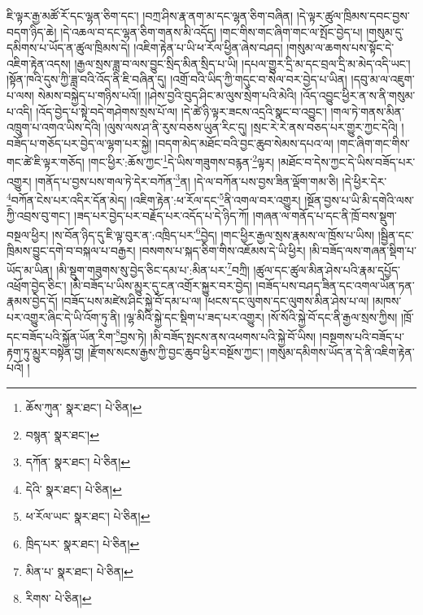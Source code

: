 ཇི་ལྟར་རྒྱ་མཚོ་རོ་དང་ལྷན་ཅིག་དང་། །བཀྲ་ཤིས་རྣ་ནག་མ་དང་ལྷན་ཅིག་བཞིན། །དེ་ལྟར་ཚུལ་ཁྲིམས་དབང་བྱས་བདག་ཉིད་ཆེ། །དེ་འཆལ་བ་དང་ལྷན་ཅིག་གནས་མི་འདོད། །གང་གིས་གང་ཞིག་གང་ལ་སྤོང་བྱེད་པ། །གསུམ་དུ་དམིགས་པ་ཡོད་ན་ཚུལ་ཁྲིམས་དེ། །འཇིག་རྟེན་པ་ཡི་ཕ་རོལ་ཕྱིན་ཞེས་བཤད། །གསུམ་ལ་ཆགས་པས་སྟོང་དེ་འཇིག་རྟེན་འདས། །རྒྱལ་སྲས་ཟླ་བ་ལས་བྱུང་སྲིད་མིན་སྲིད་པ་ཡི། །དཔལ་གྱུར་དྲི་མ་དང་བྲལ་དྲི་མ་མེད་འདི་ཡང་། །སྟོན་ཁའི་དུས་ཀྱི་ཟླ་བའི་འོད་ནི་ཇི་བཞིན་དུ། །འགྲོ་བའི་ཡིད་ཀྱི་གདུང་བ་སེལ་བར་བྱེད་པ་ཡིན། །དབུ་མ་ལ་འཇུག་པ་ལས། སེམས་བསྐྱེད་པ་གཉིས་པའོ།། །།ཤེས་བྱའི་བུད་ཤིང་མ་ལུས་སྲེག་པའི་མེའི། །འོད་འབྱུང་ཕྱིར་ན་ས་ནི་གསུམ་པ་འདི། །འོད་བྱེད་པ་སྟེ་བདེ་གཤེགས་སྲས་པོ་ལ། །དེ་ཚེ་ཉི་ལྟར་ཟངས་འདྲའི་སྣང་བ་འབྱུང་། །གལ་ཏེ་གནས་མིན་འཁྲུག་པ་འགའ་ཡིས་དེའི། །ལུས་ལས་ཤ་ནི་རུས་བཅས་ཡུན་རིང་དུ། །སྲང་རེ་རེ་ནས་བཅད་པར་གྱུར་ཀྱང་དེའི། །བཟོད་པ་གཅོད་པར་བྱེད་ལ་ལྷག་པར་སྐྱེ། །བདག་མེད་མཐོང་བའི་བྱང་ཆུབ་སེམས་དཔའ་ལ། །གང་ཞིག་གང་གིས་གང་ཚེ་ཇི་ལྟར་གཅོད། །གང་ཕྱིར་:ཆོས་ཀྱང་\footnote{ཆོས་ཀུན་  སྣར་ཐང་།  པེ་ཅིན། }དེ་ཡིས་གཟུགས་བརྙན་\footnote{བསྙན་  སྣར་ཐང་། }ལྟར། །མཐོང་བ་དེས་ཀྱང་དེ་ཡིས་བཟོད་པར་འགྱུར། །གནོད་པ་བྱས་པས་གལ་ཏེ་དེར་བཀོན་\footnote{དཀོན་  སྣར་ཐང་།  པེ་ཅིན། }ན། །དེ་ལ་བཀོན་པས་བྱས་ཟིན་ལྡོག་གམ་ཅི། །དེ་ཕྱིར་དེར་\footnote{དེའི་  སྣར་ཐང་།  པེ་ཅིན། }བཀོན་ངེས་པར་འདིར་དོན་མེད། །འཇིག་རྟེན་:ཕ་རོལ་དང་\footnote{ཕ་རོལ་ཡང་  སྣར་ཐང་།  པེ་ཅིན། }ནི་འགལ་བར་འགྱུར། །སྔོན་བྱས་པ་ཡི་མི་དགེའི་ལས་ཀྱི་འབྲས་བུ་གང་། །ཟད་པར་བྱེད་པར་བརྗོད་པར་འདོད་པ་དེ་ཉིད་ཀོ། །གཞན་ལ་གནོད་པ་དང་ནི་ཁྲོ་བས་སྡུག་བསྔལ་ཕྱིར། །ས་བོན་ཉིད་དུ་ཇི་ལྟ་བུར་ན་:འཁྲིད་པར་\footnote{ཁྲིད་པར་  སྣར་ཐང་།  པེ་ཅིན། }བྱེད། །གང་ཕྱིར་རྒྱལ་སྲས་རྣམས་ལ་ཁྲོས་པ་ཡིས། །སྦྱིན་དང་ཁྲིམས་བྱུང་དགེ་བ་བསྐལ་པ་བརྒྱར། །བསགས་པ་སྐད་ཅིག་གིས་འཇོམས་དེ་ཡི་ཕྱིར། །མི་བཟོད་ལས་གཞན་སྡིག་པ་ཡོད་མ་ཡིན། །མི་སྡུག་གཟུགས་སུ་བྱེད་ཅིང་དམ་པ་:མིན་པར་\footnote{མིན་པ་  སྣར་ཐང་།  པེ་ཅིན། }བཀྲི། །ཚུལ་དང་ཚུལ་མིན་ཤེས་པའི་རྣམ་དཔྱོད་འཕྲོག་བྱེད་ཅིང་། །མི་བཟོད་པ་ཡིས་མྱུར་དུ་ངན་འགྲོར་སྐྱུར་བར་བྱེད། །བཟོད་པས་བཤད་ཟིན་དང་འགལ་ཡོན་ཏན་རྣམས་བྱེད་དོ། །བཟོད་པས་མཛེས་ཤིང་སྐྱེ་བོ་དམ་པ་ལ། །ཕངས་དང་ལུགས་དང་ལུགས་མིན་ཤེས་པ་ལ། །མཁས་པར་འགྱུར་ཞིང་དེ་ཡི་འོག་ཏུ་ནི། །ལྷ་མིའི་སྐྱེ་དང་སྡིག་པ་ཟད་པར་འགྱུར། །སོ་སོའི་སྐྱེ་བོ་དང་ནི་རྒྱལ་སྲས་ཀྱིས། །ཁྲོ་དང་བཟོད་པའི་སྐྱོན་ཡོན་རིག་\footnote{རིགས་  པེ་ཅིན། }བྱས་ཏེ། །མི་བཟོད་སྤངས་ནས་འཕགས་པའི་སྐྱེ་བོ་ཡིས། །བསྔགས་པའི་བཟོད་པ་རྟག་ཏུ་མྱུར་བསྟེན་བྱ། །རྫོགས་སངས་རྒྱས་ཀྱི་བྱང་ཆུབ་ཕྱིར་བསྔོས་ཀྱང་། །གསུམ་དམིགས་ཡོད་ན་དེ་ནི་འཇིག་རྟེན་པའོ། །
